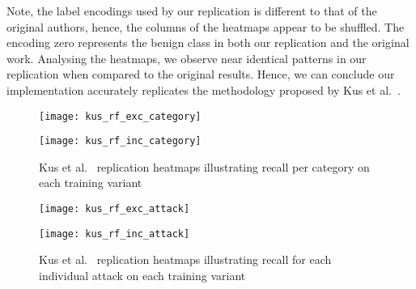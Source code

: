 Note, the label encodings used by our replication is
different to that of the original authors, hence, the columns of the heatmaps
appear to be shuffled. The encoding zero represents the benign class in both
our replication and the original work. Analysing the heatmaps, we observe near
identical patterns in our replication when compared to the original results.
Hence, we can conclude our implementation accurately replicates the methodology
proposed by Kus et al.~\cite{Kus}.
%
\begin{figure}[htbp]
    \centering
    \begin{minipage}[h]{0.5\textwidth}
        \centering
        \texttt{[image: kus\_rf\_exc\_category]}
    \end{minipage}\hfill
    \begin{minipage}[h]{0.5\textwidth}
        \centering
        \texttt{[image: kus\_rf\_inc\_category]}
    \end{minipage}
    \caption[Kus et al.~\cite{Kus} Replication Category Heatmaps]{Kus et al.~\cite{Kus} replication heatmaps illustrating recall per category on each training variant\label{fig:kus_rep_cat}}
\end{figure}

\begin{figure}[htbp]
    \centering
    \begin{minipage}[h]{0.5\textwidth}
        \centering
        \texttt{[image: kus\_rf\_exc\_attack]}
    \end{minipage}\hfill
    \begin{minipage}[h]{0.5\textwidth}
        \centering
        \texttt{[image: kus\_rf\_inc\_attack]}
    \end{minipage}
    \caption[Kus et al.~\cite{Kus} Replication Individual Attack Heatmaps]{Kus et al.~\cite{Kus} replication heatmaps illustrating recall for each individual attack on each training variant\label{fig:kus_rep_att}}
\end{figure}

